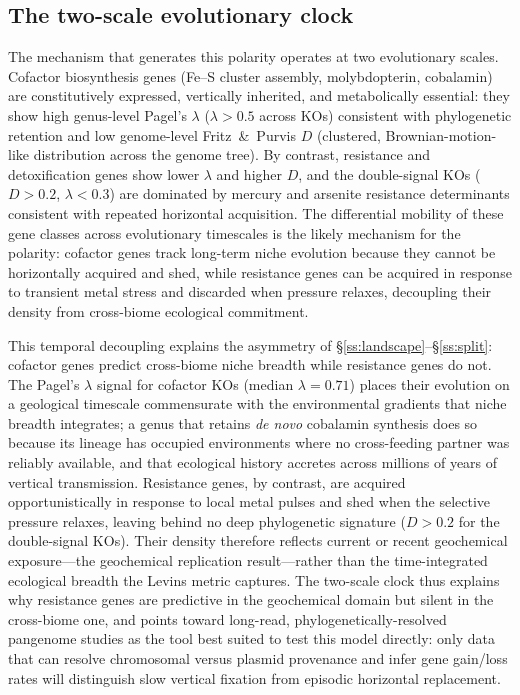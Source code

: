\documentclass[times]{zHenriquesLab-StyleBioRxiv}
\begin{document}


\subsection{The two-scale evolutionary clock}

The mechanism that generates this polarity operates at two evolutionary scales.
Cofactor biosynthesis genes (Fe--S cluster assembly, molybdopterin, cobalamin)
are constitutively expressed, vertically inherited, and metabolically essential:
they show high genus-level Pagel's $\lambda$ ($\lambda > 0.5$ across KOs)
consistent with phylogenetic retention and low genome-level Fritz~\&~Purvis $D$
(clustered, Brownian-motion-like distribution across the genome tree). By
contrast, resistance and detoxification genes show lower $\lambda$ and higher
$D$, and the double-signal KOs ($D > 0.2$, $\lambda < 0.3$) are dominated by
mercury and arsenite resistance determinants consistent with repeated horizontal
acquisition. The differential mobility of these gene classes across evolutionary
timescales is the likely mechanism for the polarity: cofactor genes track
long-term niche evolution because they cannot be horizontally acquired and shed,
while resistance genes can be acquired in response to transient metal stress and
discarded when pressure relaxes, decoupling their density from cross-biome
ecological commitment.

This temporal decoupling explains the asymmetry of \S\ref{ss:landscape}--\S\ref{ss:split}: cofactor genes predict cross-biome niche breadth while resistance genes do not. The Pagel's $\lambda$ signal for cofactor KOs (median $\lambda = 0.71$) places their evolution on a geological timescale commensurate with the environmental gradients that niche breadth integrates; a genus that retains \textit{de novo} cobalamin synthesis does so because its lineage has occupied environments where no cross-feeding partner was reliably available, and that ecological history accretes across millions of years of vertical transmission. Resistance genes, by contrast, are acquired opportunistically in response to local metal pulses and shed when the selective pressure relaxes, leaving behind no deep phylogenetic signature ($D > 0.2$ for the double-signal KOs). Their density therefore reflects current or recent geochemical exposure---the geochemical replication result---rather than the time-integrated ecological breadth the Levins metric captures. The two-scale clock thus explains why resistance genes are predictive in the geochemical domain but silent in the cross-biome one, and points toward long-read, phylogenetically-resolved pangenome studies as the tool best suited to test this model directly: only data that can resolve chromosomal versus plasmid provenance and infer gene gain/loss rates will distinguish slow vertical fixation from episodic horizontal replacement.
\end{document}
